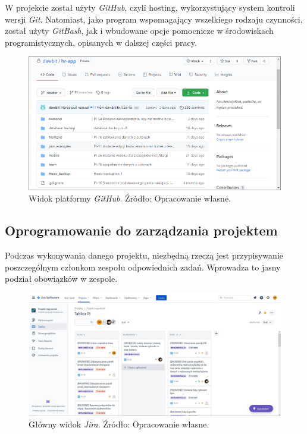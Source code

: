 \documentclass[twoside]{projektInzynierskiMS}
\numberwithin{figure}{section}
\begin{document}
W projekcie został użyty \textit{GitHub}, czyli hosting, wykorzystujący system kontroli wersji \textit{Git}. Natomiast, jako program wspomagający wszelkiego rodzaju czynności, został użyty \textit{GitBash}, jak i wbudowane opcje pomocnicze w środowiskach programistycznych, opisanych w dalszej części pracy.

\begin{figure}[h!]
  \centering
  \includegraphics[scale=0.55]{images/github.png}
    \caption{Widok platformy \textit{GitHub}. Źródło: Opracowanie własne.}
    \label{fig:github}
\end{figure}

\subsection{Oprogramowanie do zarządzania projektem}
Podczas wykonywania danego projektu, niezbędną rzeczą jest przypisywanie poszczególnym członkom zespołu odpowiednich zadań. Wprowadza to jasny podział obowiązków w zespole.

\begin{figure}[h!]
  \centering
  \includegraphics[scale=0.35]{images/jira1.JPG}
    \caption{Główny widok \textit{Jira}. Źródło: Opracowanie własne.}
    \label{fig:jira_main}
\end{figure}
\end{document}
